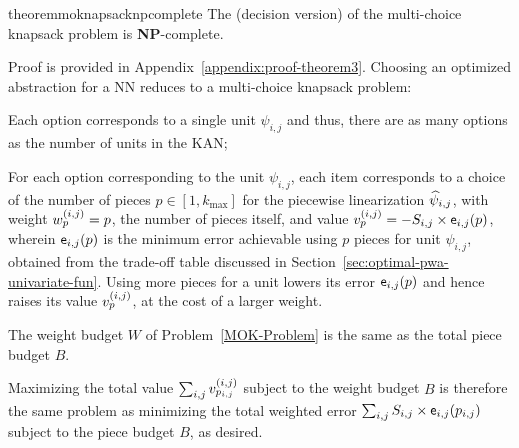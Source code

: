 \begin{restatable}{theorem}{moknapsacknpcomplete}\label{theorem:moknapsack-npcomplete}
    The (decision version) of the multi-choice knapsack problem is \textbf{NP}-complete.
\end{restatable}
Proof is provided in Appendix~\ref{appendix:proof-theorem3}.
Choosing an optimized abstraction for a NN reduces to a multi-choice knapsack problem:
\begin{inparaenum}[(a)]
        \item Each option corresponds to a single unit $\psi_{i,j}$ and thus, there are as many options as the number of units in the KAN;
        \item For each option corresponding to the unit $\psi_{i,j}$, each item corresponds to a choice of the number of pieces $p \in [1, k_{\max}]$ for the piecewise linearization $\widehat{\psi}_{i,j}$, with weight $w^{(i,j)}_{p} = p$, the number of pieces itself, and value $v^{(i,j)}_{p} = -S_{i,j} \times \mathsf{e}_{i,j}(p)$, wherein $\mathsf{e}_{i,j}(p)$ is the minimum error achievable using $p$ pieces for unit $\psi_{i,j}$, obtained from the trade-off table discussed in Section~\ref{sec:optimal-pwa-univariate-fun}. Using more pieces for a unit lowers its error $\mathsf{e}_{i,j}(p)$ and hence raises its value $v^{(i,j)}_{p}$, at the cost of a larger weight.
        \item The weight budget $W$ of Problem~\ref{MOK-Problem} is the same as the total piece budget $B$.
\end{inparaenum}
Maximizing the total value $\sum_{i,j} v^{(i,j)}_{p_{i,j}}$ subject to the weight budget $B$ is therefore the same problem as minimizing the total weighted error $\sum_{i,j} S_{i,j} \times \mathsf{e}_{i,j}(p_{i,j})$ subject to the piece budget $B$, as desired.

